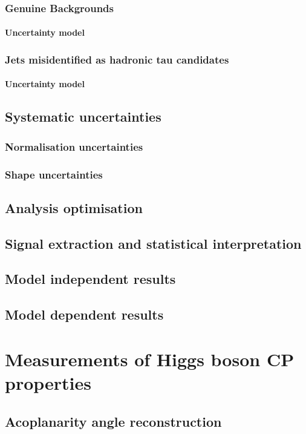 \documentclass[12pt, a4paper, twoside]{report}
\begin{document}
\subsection{Genuine Backgrounds}
\subsubsection{Uncertainty model}
\subsection{Jets misidentified as hadronic tau candidates}
\subsubsection{Uncertainty model}
\section{Systematic uncertainties}
\subsection{Normalisation uncertainties}
\subsection{Shape uncertainties}
\section{Analysis optimisation}
\section{Signal extraction and statistical interpretation}
\section{Model independent results}
\section{Model dependent results}

\chapter{Measurements of Higgs boson CP properties}
\section{Acoplanarity angle reconstruction}
\end{document}
